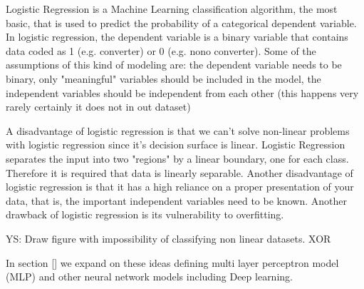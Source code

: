 \documentclass[12pt]{report}
\begin{document}





Logistic Regression is a Machine Learning classification algorithm, the most basic, that is used to predict the probability of a categorical dependent variable. 
In logistic regression, the dependent variable is a binary variable that contains data coded as 1 (e.g. converter) or 0 (e.g. nono converter).
Some of the assumptions of this kind of modeling are: the dependent variable needs to be binary, only "meaningful" variables should be included in the model, the independent variables should be independent from each other (this happens very rarely certainly it does not in out dataset) 

A disadvantage of logistic regression is that we can’t solve non-linear problems with logistic regression since it’s decision surface is linear. 
Logistic Regression separates the input into two "regions" by a linear boundary, one for each class. Therefore it is required that data is linearly separable. Another disadvantage of logistic regression is that it has a high reliance on a proper presentation of your data, that is, the important independent variables need to be known. Another drawback of logistic regression is its vulnerability to overfitting.

YS: Draw figure with impossibility of classifying non linear datasets. XOR


In section \ref{} we expand on these ideas defining multi layer perceptron model (MLP) and other neural network models including Deep learning.
\end{document}

